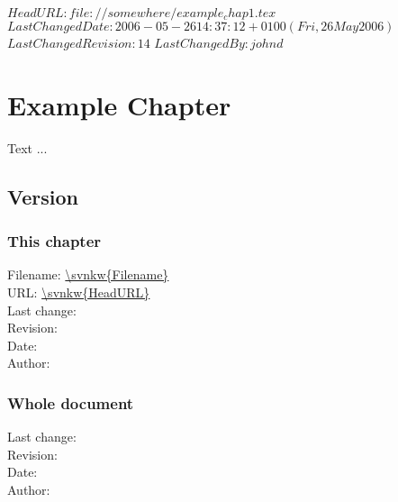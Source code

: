 \svnidlong
{$HeadURL: file://somewhere/example_chap1.tex $}
{$LastChangedDate: 2006-05-26 14:37:12 +0100 (Fri, 26 May 2006) $}
{$LastChangedRevision: 14 $}
{$LastChangedBy: johnd $}

\chapter{Example Chapter}
Text ...

\section{Version}
\subsection*{This chapter}
Filename: \url{\svnkw{Filename}}\\
URL: \url{\svnkw{HeadURL}}\\
Last change:\\
Revision: \svnfilerev\\
Date: \svnfiledate\\
Author: \svnfileauthor\\

\subsection*{Whole document}
Last change:\\
Revision: \svnrev\\
Date: \svndate\\
Author: \svnauthor\\

